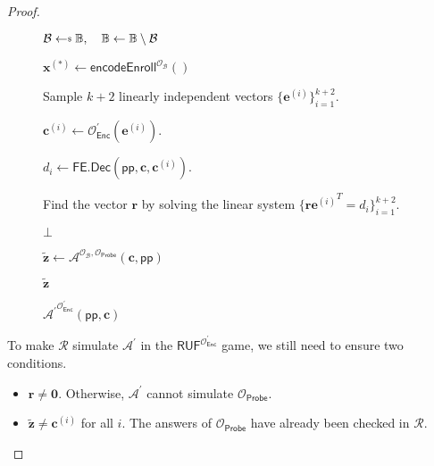 \begin{proof}
\begin{figure}[h]
\centering
	
	\begin{minipage}[t]{0.8\linewidth}
	\centering
	\begin{algorithm}[H]
	\caption{$ {\mathcal{A}^\prime}^{ \mathcal{O}^\prime_{\textsf{Enc}} } (\textsf{pp}, \mathbf{c}) $}
	\label{alg:adv:ind-uf-OB-Probe}
	\begin{algorithmic}[1]
		\State $\mathcal{B} \getsdollar \mathbb{B}, \quad \mathbb{B} \gets \mathbb{B} \setminus \mathcal{B}$ \label{alg:adv:ind-uf-OB-Probe:B}
		
		\State $\mathbf{x}^{(*)} \gets \textsf{encodeEnroll}^{ \mathcal{O}_{\mathcal{B}} } ()$

		\State Sample $k+2$ linearly independent vectors $\{ \mathbf{e}^{(i)} \}_{i=1}^{k+2}$.

			\State $\mathbf{c}^{(i)} \gets \mathcal{O}^\prime_{\textsf{Enc}}(\mathbf{e}^{(i)})$.

			\State $d_i \gets \textsf{FE.Dec}(\textsf{pp}, \mathbf{c}, \mathbf{c}^{(i)})$.
		\EndFor

		\State Find the vector $\mathbf{r}$ by solving the linear system $\{ \mathbf{r} {\mathbf{e}^{(i)}}^T = d_i \}_{i=1}^{k+2}$.


			\State \Return $\bot$

		\EndIf

		\State ${\mathbf{\tilde{z}}} \gets \mathcal{A}^{\mathcal{O}_{\mathcal{B}}, \mathcal{O}_{\textsf{Probe}} } ( \mathbf{c}, \textsf{pp})$
		
		\State \Return ${\mathbf{\tilde{z}}}$
	\end{algorithmic}
	\end{algorithm}
	\end{minipage}
	
\end{figure}

To make $\mathcal{R}$ simulate $\mathcal{A}^\prime$ in the $\textsf{RUF}^{ \mathcal{O}^\prime_{\textsf{Enc}} }$ game, we still need to ensure two conditions.

\begin{itemize}

	\item $\mathbf{r} \neq \mathbf{0}$. Otherwise, $\mathcal{A}^\prime$ cannot simulate $\mathcal{O}_\textsf{Probe}$. 

	\item $\mathbf{\tilde{z}} \neq \mathbf{c}^{(i)}$ for all $i$. The answers of $\mathcal{O}_\textsf{Probe}$ have already been checked in $\mathcal{R}$. 
\end{itemize}


\end{proof}
